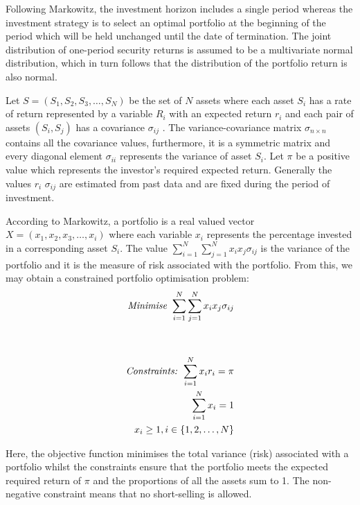 \documentclass{pdfmx4020}
\begin{document}
    Following Markowitz, the investment horizon includes a single period whereas the investment strategy is to select an optimal portfolio at the beginning of the period which will be held unchanged until the date of termination. The joint distribution of one-period security returns is assumed to be a multivariate normal distribution, which in turn follows that the distribution of the portfolio return is also normal. 

    Let $S = (S_1,S_2,S_3, \dots , S_N)$ be the set of $N$ assets where each asset $S_i$ has a rate of return represented by a variable $R_i$ with an expected return $r_i$ and each pair of assets $(S_i,S_j)$ has a covariance $\sigma_{ij}$ . The variance-covariance matrix $\sigma_{n\times n}$ contains all the covariance values, furthermore, it is a symmetric matrix and every diagonal element $\sigma_{ii}$ represents the variance of asset $S_i$. Let $\pi$ be a positive value which represents the investor's required expected return. Generally the values $r_i$ $\sigma_{ij}$ are estimated from past data and are fixed during the period of investment. 

    According to Markowitz, a portfolio is a real valued vector $X = (x_1,x_2,x_3, \dots ,x_i)$ where each variable $x_i$ represents the percentage invested in a corresponding asset $S_i$. The value $\sum\limits_{i=1}^N \sum\limits_{j=1}^N x_i x_j \sigma_{ij}$ is the variance of the portfolio and it is the measure of risk associated with the portfolio. From this, we may obtain a constrained portfolio optimisation problem: 
    \begin{equation}
      \begin{split}
        \mbox{\textit{Minimise  }} \sum\limits_{i=1}^N \sum\limits_{j=1}^N x_i x_j \sigma_{ij} \\
        \\\\
        \mbox{\textit{Constraints:} }
        \sum\limits_{i=1}^N x_i r_i = \pi \\
        \sum\limits_{i=1}^N x_i = 1 \\
        x_i \geq 1, i \in \{1,2,\dots,N\}
      \end{split}
    \end{equation}

    Here, the objective function minimises the total variance (risk) associated with a portfolio whilst the constraints ensure that the portfolio meets the expected required return of $\pi$ and the proportions of all the assets sum to 1. The non-negative constraint means that no short-selling is allowed. 
\end{document}
